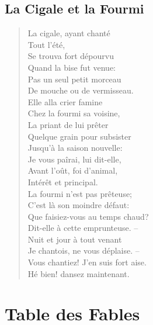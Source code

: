 \documentclass{book}
\newenvironment{fable}[1]{\section{#1}\begin{verse}}{\end{verse}}
\begin{document}
\paragraph{}
\mainmatter
\begin{fable}{La Cigale et la Fourmi}
La cigale, ayant chant\'e\\
Tout l'\'et\'e,\\
Se trouva fort d\'epourvu\\
Quand la bise fut venue:\\
Pas un seul petit morceau\\
De mouche ou de vermisseau.\\
Elle alla crier famine\\
Chez la fourmi sa voisine,\\
La priant de lui pr\^eter\\

Quelque grain pour subsister\\
Jusqu'\`a la saison nouvelle:\\
Je vous pa\^irai, lui dit-elle,\\
Avant l'o\^ut, foi d'animal,\\
Int\'er\^et et principal.\\
La fourmi n'est pas pr\^eteuse;\\
C'est l\`a son moindre d\'efaut:\\
Que faisiez-vous au temps chaud?\\
Dit-elle \`a cette emprunteuse. --\\
Nuit et jour \`a tout venant\\
Je chantois, ne vous d\'eplaise. --\\
Vous chantiez! J'en suis fort aise.\\
H\'e bien! dansez maintenant.
\end{fable}

\backmatter
\chapter*{Table des Fables}
\end{document}
